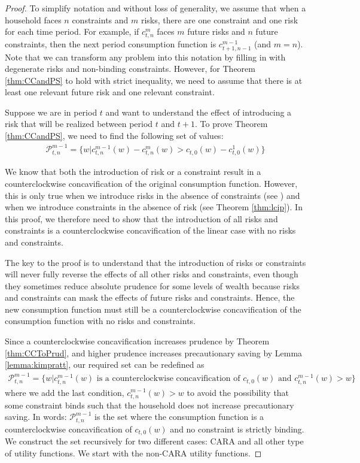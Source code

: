 \documentclass[titlepage]{\econtex}
\begin{document}
\begin{proof}
	To simplify notation and without loss of generality, we assume that when a household faces $n$ constraints and $m$ risks, there are one constraint and one risk for each time period. For example, if $c_{t,n}^{m}$ faces $m$ future risks and $n$ future constraints, then the next period consumption function is $c_{t+1,n-1}^{m-1}$ (and $m = n$). Note that we can transform any problem into this notation by filling in with degenerate risks and non-binding constraints. However, for Theorem \ref{thm:CCandPS} to hold with strict inequality, we need to assume that there is at least one relevant future risk and one relevant constraint. 
	
	Suppose we are in period $t$ and want to understand the effect of introducing a risk that will be realized between period $t$ and $t+1$. To prove Theorem \ref{thm:CCandPS}, we need to find the following set of values:
	\begin{align}
	\mathcal{P}_{t,n}^{m-1} = \{ w | c_{t,n}^{m-1}(w)-c_{t,n}^{m}(w)>c_{t,0}(w)-c^{1}_{t,0}(w) \} \label{eq:whatcanbesaid_proof}
	\end{align}
	
	We know that both the introduction of risk or a constraint result in a counterclockwise concavification of the original consumption function. However, this is only true when we introduce risks in the absence of constraints (see \citealp{carroll&kimball:concavity}) and when we introduce constraints in the absence of risk (see Theorem \ref{thm:lcip}). In this proof, we therefore need to show that the introduction of all risks and constraints is a counterclockwise concavification of the linear case with no risks and constraints.
	
	The key to the proof is to understand that the introduction of risks or constraints will never fully reverse the effects of all other risks and constraints, even though they sometimes reduce absolute prudence for some levels of wealth because risks and constraints can mask the effects of future risks and constraints. Hence, the new consumption function must still be a counterclockwise concavification of the consumption function with no risks and constraints. 
	
	Since a counterclockwise concavification increases prudence by Theorem \ref{thm:CCToPrud}, and higher prudence increases precautionary saving by Lemma \ref{lemma:kimpratt}, our required set can be redefined as 
	\begin{align*} \mathcal{P}_{t,n}^{m-1} = \{w | c_{t,n}^{m-1}(w) \text{ is a counterclockwise concavification of } c_{t,0}(w) \text{ and } c_{t,n}^{m-1}(w) > w
	\}\end{align*}
	where we add the last condition, $c_{t,n}^{m-1}(w) > w$ to avoid the possibility that some constraint binds such that the household does not increase precautionary saving. In words: $\mathcal{P}_{t,n}^{m-1}$ is the set where the consumption function is a counterclockwise concavification of $c_{t,0}(w)$ and no constraint is strictly binding. We construct the set recursively for two different cases: CARA and all other type of utility functions. We start with the non-CARA utility functions. 
	

\end{proof}
\end{document}
